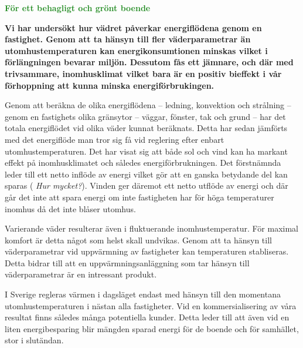 \documentclass[11pt,a4paper]{article}
\begin{document}
\addtolength{\parindent}{-0.6 cm}
\pagestyle{fancy}
\rhead{\sc\footnotesize \today}
\mbox{}

\begin{center}
\textcolor{ForestGreen}{\textbf{\Huge För ett behagligt och grönt boende}}
\end{center}

\mbox{}

\setlength{\columnsep}{5mm}
\begin{multicols}{2}
\addtolength{\parskip}{1.3ex}
\linespread{1.02}
\normalsize



\textbf{Vi har undersökt hur vädret påverkar energiflödena genom en fastighet. Genom att ta hänsyn till fler väderparametrar än utomhustemperaturen kan energikonsumtionen minskas vilket i förlängningen bevarar miljön. Dessutom fås ett jämnare, och där med trivsammare, inomhusklimat vilket bara är en positiv bieffekt i vår förhoppning att kunna minska energiförbrukingen.}

Genom att beräkna de olika energiflödena – ledning, konvektion och strålning – genom en fastighets olika gränsytor – väggar, fönster, tak och grund – har det totala energiflödet vid olika väder kunnat beräknats. Detta har sedan jämförts med det energiflöde man tror sig få vid reglering efter enbart utomhustemperaturen. 
Det har visat sig att både sol och vind kan
ha markant effekt på inomhusklimatet och således energiförbrukningen. Det 
förstnämnda leder till ett netto inflöde av energi vilket gör att en ganska
betydande del kan sparas (\emph{\color{red} Hur mycket?}). Vinden
ger däremot ett netto utflöde av energi och där går det inte att spara energi
om inte fastigheten har för höga temperaturer inomhus då det inte blåser utomhus.

Varierande väder resulterar även i fluktuerande inomhustemperatur. För maximal komfort är detta något som helst skall undvikas. Genom att ta hänsyn till väderparametrar vid uppvärmning av fastigheter kan temperaturen stabliseras. Detta bidrar till att en uppvärmningsanläggning som tar hänsyn till väderparametrar är en intressant produkt.

I Sverige regleras värmen i dagsläget endast med hänsyn till den momentana utomhustemperaturen i nästan alla fastigheter. Vid en kommersialisering av våra
resultat finns således många potentiella kunder. Detta leder till att även vid en liten
energibesparing blir mängden sparad energi för de boende och för samhället,
stor i slutändan.



\end{multicols}
\end{document}

